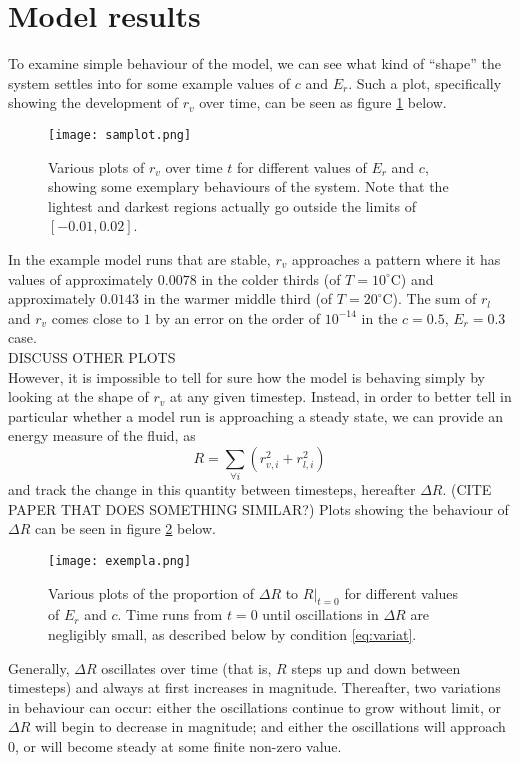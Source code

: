 \documentclass[11pt]{article}
\begin{document}
\section{Model results}
To examine simple behaviour of the model, we can see what kind of ``shape'' the system settles into for some example values of $c$ and $E_r$. Such a plot, specifically showing the development of $r_v$ over time, can be seen as figure \ref{fig:samplot} below.
\begin{figure}[H]
\centering
\texttt{[image: samplot.png]}
\caption{Various plots of $r_v$ over time $t$ for different values of $E_r$ and $c$, showing some exemplary behaviours of the system. Note that the lightest and darkest regions actually go outside the limits of $[-0.01,0.02]$.}
\label{fig:samplot}
\end{figure}
In the example model runs that are stable, $r_v$ approaches a pattern where it has values of approximately $0.0078$ in the colder thirds (of $T=10^{\circ}$C) and approximately $0.0143$ in the warmer middle third (of $T=20^{\circ}$C). The sum of $r_l$ and $r_v$ comes close to $1$ by an error on the order of $10^{-14}$ in the $c=0.5$, $E_r=0.3$ case. \\
DISCUSS OTHER PLOTS \\
However, it is impossible to tell for sure how the model is behaving simply by looking at the shape of $r_v$ at any given timestep. Instead, in order to better tell in particular whether a model run is approaching a steady state, we can provide an energy measure of the fluid, as
\[
R = \sum_{\forall i}\left(r_{v,i}^2+r_{l,i}^2\right)
\]
and track the change in this quantity between timesteps, hereafter $\Delta R$. (CITE PAPER THAT DOES SOMETHING SIMILAR?) Plots showing the behaviour of $\Delta R$ can be seen in figure \ref{fig:exempla} below.
\begin{figure}[H]
\centering
\texttt{[image: exempla.png]}
\caption{Various plots of the proportion of $\Delta R$ to $R|_{t=0}$ for different values of $E_r$ and $c$. Time runs from $t=0$ until oscillations in $\Delta R$ are negligibly small, as described below by condition \ref{eq:variat}.}
\label{fig:exempla}
\end{figure}
Generally, $\Delta R$ oscillates over time (that is, $R$ steps up and down between timesteps) and always at first increases in magnitude. Thereafter, two variations in behaviour can occur: either the oscillations continue to grow without limit, or $\Delta R$ will begin to decrease in magnitude; and either the oscillations will approach $0$, or will become steady at some finite non-zero value. \\
\end{document}
